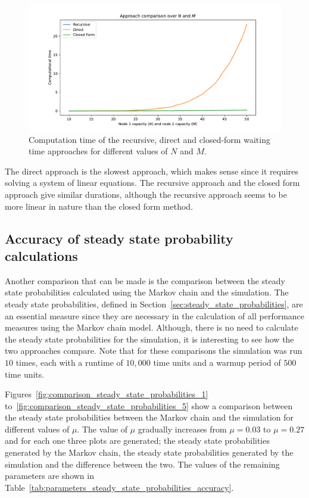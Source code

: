 \begin{figure}[H]
    \includegraphics[width=\textwidth]{chapters/03_queueing_model/Bin/numeric_results_and_timings/waiting_time_formulas_comparison/algorithm_duration_over_N_and_M.pdf}
    \caption{Computation time of the recursive, direct and closed-form waiting
    time approaches for different values of \(N\) and \(M\).}
    \label{fig:waiting_time_algorithm_duration_over_N_and_M}
\end{figure}

The direct approach is the slowest approach, which makes sense since it requires
solving a system of linear equations.
The recursive approach and the closed form approach give similar durations,
although the recursive approach seems to be more linear in nature than the
closed form method.


\subsection{Accuracy of steady state probability calculations}
\label{sec:accuracy_of_steady_state_probabilities}

Another comparison that can be made is the comparison between the steady state
probabilities calculated using the Markov chain and the simulation.
The steady state probabilities, defined in
Section~\ref{sec:steady_state_probabilities}, are an essential measure since
they are necessary in the calculation of all performance measures using the
Markov chain model.
Although, there is no need to calculate the steady state probabilities for the
simulation, it is interesting to see how the two approaches compare.
Note that for these comparisons the simulation was run \(10\) times, each
with a runtime of \(10,\!000\) time units and a warmup period of \(500\) time
units.

Figures~\ref{fig:comparison_steady_state_probabilities_1}
to~\ref{fig:comparison_steady_state_probabilities_5} show a comparison between
the steady state probabilities between the Markov chain and the simulation
for different values of \(\mu\).
The value of \(\mu\) gradually increases from \(\mu = 0.03\) to \(\mu = 0.27\)
and for each one three plots are generated; the steady state probabilities
generated by the Markov chain, the steady state probabilities generated by the
simulation and the difference between the two.
The values of the remaining parameters are shown in
Table~\ref{tab:parameters_steady_state_probabilities_accuracy}.

